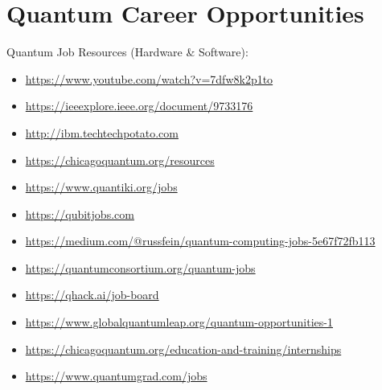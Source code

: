 \chapter{\LARGE{Quantum Career Opportunities}}

\begin{flushleft}
\large{Quantum Job Resources (Hardware \& Software):}
\end{flushleft}

\centering

\large\begin{itemize}
\item\url{https://www.youtube.com/watch?v=7dfw8k2p1to}
\item\url{https://ieeexplore.ieee.org/document/9733176}
\item\url{http://ibm.techtechpotato.com}
\item\url{https://chicagoquantum.org/resources} 
\item\url{https://www.quantiki.org/jobs} 
\item\url{https://qubitjobs.com} 
\item\url{https://medium.com/@russfein/quantum-computing-jobs-5e67f72fb113} 
\item\url{https://quantumconsortium.org/quantum-jobs} 
\item\url{https://qhack.ai/job-board}  
\item\url{https://www.globalquantumleap.org/quantum-opportunities-1} 
\item\url{https://chicagoquantum.org/education-and-training/internships} 
\item\url{https://www.quantumgrad.com/jobs}

\end{itemize}